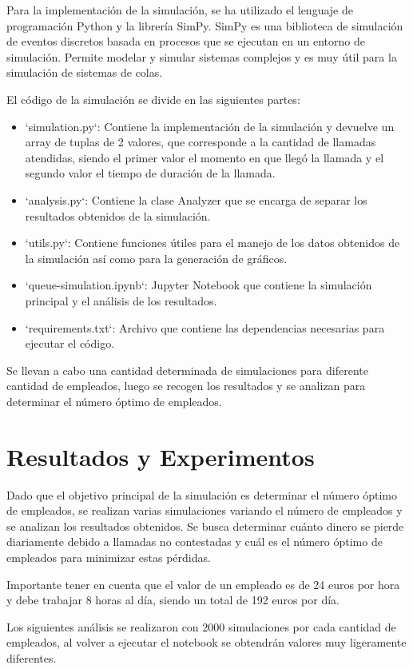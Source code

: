 \documentclass{article}
\begin{document}
Para la implementación de la simulación, se ha utilizado el lenguaje de programación Python y la librería SimPy. SimPy es una biblioteca de simulación de eventos discretos basada en procesos que se ejecutan en un entorno de simulación. Permite modelar y simular sistemas complejos y es muy útil para la simulación de sistemas de colas.

El código de la simulación se divide en las siguientes partes:
\begin{itemize}
    \item `simulation.py`: Contiene la implementación de la simulación y devuelve un array de tuplas de 2 valores, que corresponde a la cantidad de llamadas atendidas, siendo el primer valor el momento en que llegó la llamada y el segundo valor el tiempo de duración de la llamada.
    \item `analysis.py`: Contiene la clase Analyzer que se encarga de separar los resultados obtenidos de la simulación.
    \item `utils.py`: Contiene funciones útiles para el manejo de los datos obtenidos de la simulación así como para la generación de gráficos.
    \item `queue-simulation.ipynb`: Jupyter Notebook que contiene la simulación principal y el análisis de los resultados.
    \item `requirements.txt`: Archivo que contiene las dependencias necesarias para ejecutar el código.
\end{itemize}

Se llevan a cabo una cantidad determinada de simulaciones para diferente cantidad de empleados, luego se recogen los resultados y se analizan para determinar el número óptimo de empleados.

\section{Resultados y Experimentos}
Dado que el objetivo principal de la simulación es determinar el número óptimo de empleados, se realizan varias simulaciones variando el número de empleados y se analizan los resultados obtenidos. Se busca determinar cuánto dinero se pierde diariamente debido a llamadas no contestadas y cuál es el número óptimo de empleados para minimizar estas pérdidas.

Importante tener en cuenta que el valor de un empleado es de 24 euros por hora y debe trabajar 8 horas al día, siendo un total de 192 euros por día.

Los siguientes análisis se realizaron con 2000 simulaciones por cada cantidad de empleados, al volver a ejecutar el notebook se obtendrán valores muy ligeramente diferentes.
\end{document}
